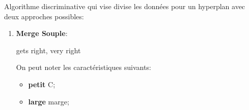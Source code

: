 \documentclass{article}
\begin{document}
\begin{definition}
    Algorithme discriminative qui vise divise les données pour un hyperplan avec deux approches possibles:
    \begin{enumerate}[rightmargin = \leftmargin]
        \item \textbf{Merge Souple}:
        \begin{definition}
            gets right, very right
        \end{definition}
        On peut noter les caractéristiques suivants:
        \begin{itemize}[noitemsep]
            \item \textbf{petit} C;
            \item \textbf{large} marge;
        \end{itemize}


\end{enumerate}
\end{definition}
\end{document}
